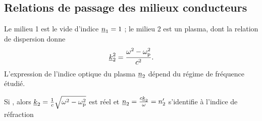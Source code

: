 \documentclass[12pt,fancy]{cours}%
\begin{document}
\subsection{Relations de passage des milieux conducteurs}
Le milieu 1 est le vide d’indice $\underline{n}_1=1$ ; le milieu 2 est un plasma, dont la relation de dispersion donne
\begin{equation}
  \underline{k}_2^2=\frac{\omega^2-\omega_{\rm{p}}^2}{c^2}.
\end{equation}
L'expression de l'indice optique du plasma $\underline{n}_2$ dépend du régime de fréquence étudié.

\begin{liste}
\item Si , alors $\underline{k}_2=\frac{1}{c}\sqrt{\omega^2-\omega_{\rm{p}}^2}$  est réel et $\underline{n}_2= \frac{c \underline{k}_2}{\omega} =  n_2'$ s'identifie à l'indice de réfraction


\end{liste}
\end{document}
